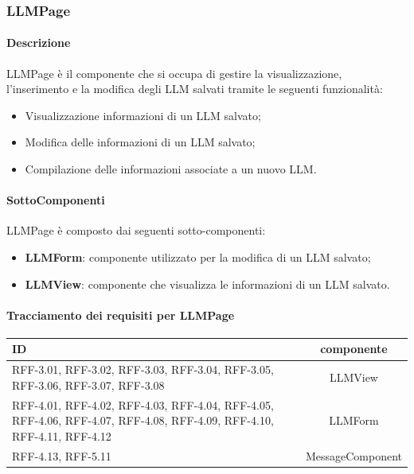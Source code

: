 \subsubsection{LLMPage} 
\label{sec:LLMPage}
\paragraph{Descrizione}
LLMPage è il componente che si occupa di gestire la visualizzazione, l'inserimento e la modifica degli LLM salvati tramite le seguenti funzionalità:
\begin{itemize}
    \item Visualizzazione informazioni di un LLM salvato;
    \item Modifica delle informazioni di un LLM salvato;
    \item Compilazione delle informazioni associate a un nuovo LLM.
\end{itemize}

\paragraph{SottoComponenti}
LLMPage è composto dai seguenti sotto-componenti:
\begin{itemize}        
        \item \textbf{LLMForm}: componente utilizzato per la modifica di un LLM salvato;
        \item \textbf{LLMView}: componente che visualizza le informazioni di un LLM salvato.
    \end{itemize}

\paragraph{Tracciamento dei requisiti per LLMPage}
\begin{tabularx}{\textwidth}{|X|c|}
    \hline
    \textbf{ID} & \textbf{componente} \\
    \hline
        RFF-3.01, RFF-3.02, RFF-3.03, RFF-3.04, RFF-3.05, RFF-3.06, RFF-3.07, RFF-3.08 & LLMView \\
    \hline
        RFF-4.01, RFF-4.02, RFF-4.03, RFF-4.04, RFF-4.05, RFF-4.06, RFF-4.07, RFF-4.08, RFF-4.09, RFF-4.10, RFF-4.11, RFF-4.12 & LLMForm \\
    \hline
        RFF-4.13, RFF-5.11 & MessageComponent \\
    \hline
\end{tabularx} 